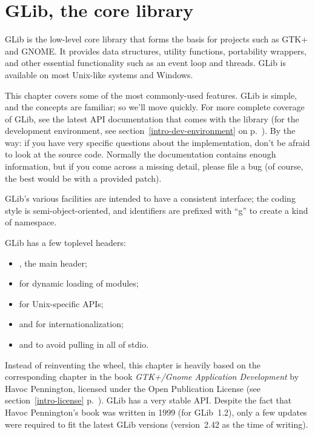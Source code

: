\chapter{GLib, the core library}

GLib is the low-level core library that forms the basis for projects such as GTK+ and GNOME. It provides data structures, utility functions, portability wrappers, and other essential functionality such as an event loop and threads. GLib is available on most Unix-like systems and Windows.

This chapter covers some of the most commonly-used features. GLib is simple, and the concepts are familiar; so we'll move quickly. For more complete coverage of GLib, see the latest API documentation that comes with the library (for the development environment, see section~\ref{intro-dev-environment} on p.~\pageref{intro-dev-environment}). By the way: if you have very specific questions about the implementation, don't be afraid to look at the source code. Normally the documentation contains enough information, but if you come across a missing detail, please file a bug (of course, the best would be with a provided patch).

GLib's various facilities are intended to have a consistent interface; the coding style is semi-object-oriented, and identifiers are prefixed with ``g'' to create a kind of namespace.

GLib has a few toplevel headers:
\begin{itemize}
  \item {}, the main header;
  \item {} for dynamic loading of modules;
  \item {} for Unix-specific APIs;
  \item {} and  for internationalization;
  \item {} and  to avoid pulling in all of stdio.
\end{itemize}

Instead of reinventing the wheel, this chapter is heavily based on the corresponding chapter in the book \emph{GTK+/Gnome Application Development} by Havoc Pennington, licensed under the Open Publication License (see section~\ref{intro-license} p.~\pageref{intro-license}). GLib has a very stable API. Despite the fact that Havoc Pennington's book was written in 1999 (for GLib~1.2), only a few updates were required to fit the latest GLib versions (version~2.42 as the time of writing).

